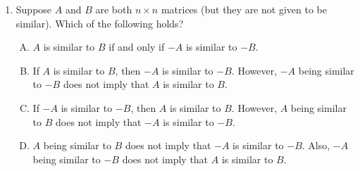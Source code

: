 \documentclass[10pt]{amsart}
\begin{document}
\begin{enumerate}
  {\em Answer}: Option (E)

  {\em Explanation}: There isn't even an {\em a priori} reason why any
  of the options should be true, unlike for the previous question
  where at least {\em a priori} the options are plausible. For Options
  (A) and (C), the following $1 \times 1$ counterexample works: $A_1 =
  B_1 = [1]$, $A_2 = B_2 = [2]$. For Option (B), we cannot use $1
  \times 1$ counterexamples, because in the $1 \times 1$ case, we'd
  have $A_1 - B_1 = A_2 - B_2 = [0]$. We can, however, use $2 \times
  2$ counterexamples. Explicitly, consider the example:

  $$A_1 = A_2 = B_1 = \left[\begin{matrix} 1 & 0 \\ 0 & 0 \\\end{matrix}\right], B_2 = \left[\begin{matrix} 0 & 0 \\ 0 & 1 \\\end{matrix}\right]$$

  Here, we have:

  $$A_1 - B_1 = \left[\begin{matrix} 0 & 0 \\ 0 & 0 \\\end{matrix}\right], A_2 - B_2 = \left[\begin{matrix} 1 & 0 \\ 0 & -1 \\\end{matrix}\right]$$

  Clearly, $A_1 - B_1$ is {\em not} similar to $A_2 - B_2$.

  {\em Performance review}: 17 out of 23 people got this. 3 each chose
  (C) and (D).

\item Suppose $A$ and $B$ are both $n \times n$ matrices
  (but they are not given to be similar). Which of the following
  holds?

  \begin{enumerate}[(A)]
  \item $A$ is similar to $B$ if and only if $-A$ is similar to $-B$.
  \item If $A$ is similar to $B$, then $-A$ is similar to
    $-B$. However, $-A$ being similar to $-B$ does not
    imply that $A$ is similar to $B$.
  \item If $-A$ is similar to $-B$, then $A$ is similar to
    $B$. However, $A$ being similar to $B$ does not imply that
    $-A$ is similar to $-B$.
  \item $A$ being similar to $B$ does not imply that $-A$ is
    similar to $-B$. Also, $-A$ being similar to $-B$ does
    not imply that $A$ is similar to $B$.
  \end{enumerate}


\end{enumerate}
\end{document}
